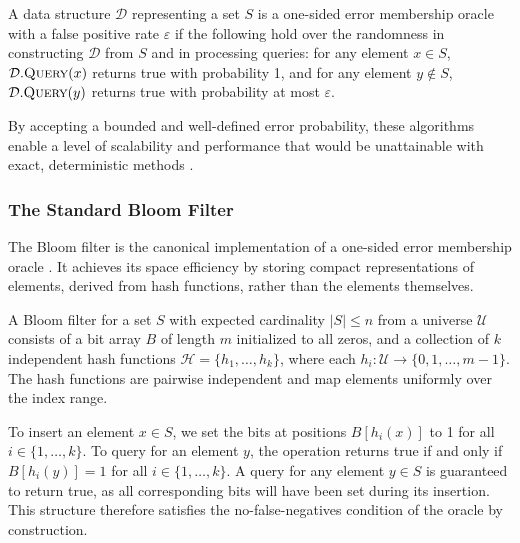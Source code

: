 \begin{definition}
    A data structure $\mathcal{D}$ representing a set $S$ is a one-sided error membership oracle with a false positive rate $\varepsilon$ if the following hold over the randomness in constructing $\mathcal{D}$ from $S$ and in processing queries: for any element $x \in S$, $\mathcal{D}.\textsc{Query}(x)$ returns true with probability 1, and for any element $y \notin S$, $\mathcal{D}.\textsc{Query}(y)$ returns true with probability at most $\varepsilon$.
\end{definition}

By accepting a bounded and well-defined error probability, these algorithms enable a level of scalability and performance that would be unattainable with exact, deterministic methods \cite{Tarkoma2012TheoryAP, Chang2006BigtableAD}.

\subsubsection{The Standard Bloom Filter}

The Bloom filter is the canonical implementation of a one-sided error membership oracle \cite{Bloom1970SpacetimeTI}. It achieves its space efficiency by storing compact representations of elements, derived from hash functions, rather than the elements themselves.

\begin{definition}
    A Bloom filter for a set $S$ with expected cardinality $|S| \leq n$ from a universe $\mathcal{U}$ consists of a bit array $B$ of length $m$ initialized to all zeros, and a collection of $k$ independent hash functions $\mathcal{H} = \{h_1, \ldots, h_k\}$, where each $h_i : \mathcal{U} \to \{0, 1, \ldots, m-1\}$. The hash functions are pairwise independent and map elements uniformly over the index range.
\end{definition}

To insert an element $x \in S$, we set the bits at positions $B[h_i(x)]$ to 1 for all $i \in \{1, \ldots, k\}$. To query for an element $y$, the operation returns true if and only if $B[h_i(y)] = 1$ for all $i \in \{1, \ldots, k\}$. A query for any element $y \in S$ is guaranteed to return true, as all corresponding bits will have been set during its insertion. This structure therefore satisfies the no-false-negatives condition of the oracle by construction.

